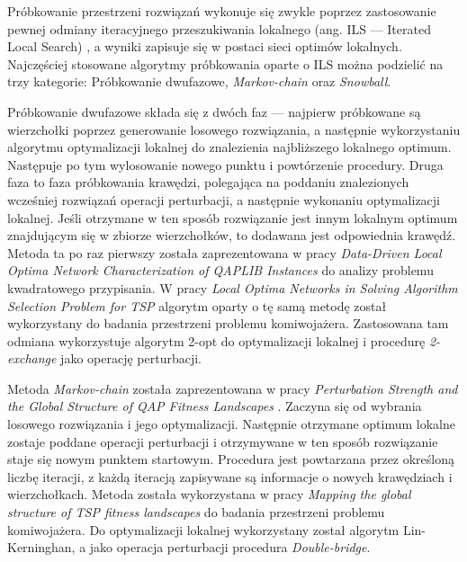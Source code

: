 Próbkowanie przestrzeni rozwiązań wykonuje się zwykle poprzez zastosowanie pewnej odmiany iteracyjnego przeszukiwania lokalnego
(ang. ILS --- Iterated Local Search) \cite{DBLP:journals/corr/OchoaVDT14},
a wyniki zapisuje się w postaci sieci optimów lokalnych.
Najczęściej stosowane algorytmy próbkowania oparte o ILS można podzielić na trzy kategorie:
Próbkowanie dwufazowe, \textit{Markov-chain} oraz \textit{Snowball}.

Próbkowanie dwufazowe składa się z dwóch faz --- najpierw próbkowane są wierzchołki poprzez  generowanie
losowego rozwiązania, a następnie wykorzystaniu algorytmu optymalizacji lokalnej do znalezienia najbliższego
lokalnego optimum. Następuje po tym wylosowanie nowego punktu i powtórzenie procedury.
Druga faza to faza próbkowania krawędzi, polegająca na poddaniu znalezionych wcześniej rozwiązań operacji perturbacji, a następnie wykonaniu optymalizacji
lokalnej. Jeśli otrzymane w ten sposób rozwiązanie jest innym lokalnym optimum znajdującym się w zbiorze wierzchołków, to dodawana jest odpowiednia krawędź.
Metoda ta po raz pierwszy została zaprezentowana w pracy \textit{Data-Driven Local Optima Network Characterization of QAPLIB Instances} \cite{10.1145/2576768.2598275}
do analizy problemu kwadratowego przypisania.
W pracy \textit{Local Optima Networks in Solving Algorithm Selection Problem for TSP} \cite{DBLP:conf/depcos/BozejkoGNAB18}
algorytm oparty o tę samą metodę został wykorzystany do badania przestrzeni problemu komiwojażera.
Zastosowana tam odmiana wykorzystuje algorytm 2-opt do optymalizacji lokalnej i procedurę \textit{2-exchange} jako operację perturbacji.

Metoda \textit{Markov-chain} została zaprezentowana w pracy \textit{Perturbation Strength and the Global Structure of QAP Fitness Landscapes} \cite{markovchain}.
Zaczyna się od wybrania losowego rozwiązania i jego optymalizacji. Następnie otrzymane optimum lokalne zostaje poddane operacji perturbacji
i otrzymywane w ten sposób rozwiązanie staje się nowym punktem startowym. Procedura jest powtarzana przez określoną liczbę iteracji, z każdą iteracją
zapisywane są informacje o nowych krawędziach i wierzchołkach.
Metoda została wykorzystana w pracy \textit{Mapping the global structure of TSP fitness landscapes} \cite{DBLP:journals/heuristics/OchoaV18} do badania przestrzeni problemu komiwojażera.
Do optymalizacji lokalnej wykorzystany został algorytm Lin-Kerninghan, a jako operacja perturbacji procedura \textit{Double-bridge}.


